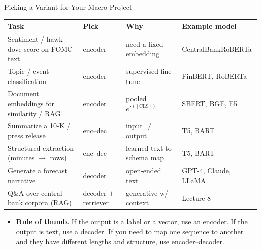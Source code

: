 \begin{frame}{Picking a Variant for Your Macro Project}
\begin{center}
\renewcommand{\arraystretch}{1.3}
\footnotesize
\begin{tabular}{l l l l}
\toprule
\textbf{Task} & \textbf{Pick} & \textbf{Why} & \textbf{Example model} \\
\midrule
Sentiment / hawk--dove score on FOMC text & encoder & need a fixed embedding & CentralBankRoBERTa \\
Topic / event classification              & encoder & supervised fine-tune  & FinBERT, RoBERTa \\
Document embeddings for similarity / RAG  & encoder & pooled $e'^{([\text{CLS}])}$ & SBERT, BGE, E5 \\
Summarize a 10-K / press release          & enc--dec & input $\neq$ output & T5, BART \\
Structured extraction (minutes $\to$ rows) & enc--dec & learned text-to-schema map & T5, BART \\
Generate a forecast narrative             & decoder & open-ended text      & GPT-4, Claude, LLaMA \\
Q\&A over central-bank corpora (RAG)      & decoder $+$ retriever & generative w/ context & Lecture 8 \\
\bottomrule
\end{tabular}
\end{center}

\medskip
\begin{itemize}
\item \textbf{Rule of thumb.} If the output is a label or a vector, use an encoder. If the output is text, use a decoder. If you need to map one sequence to another and they have different lengths and structure, use encoder--decoder.
\end{itemize}
\end{frame}

